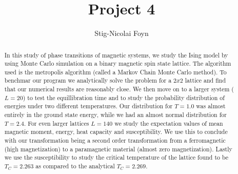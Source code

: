 \documentclass{emulateapj}
\begin{document}
\title{Project 4}

\author{Stig-Nicolai Foyn}




\begin{abstract}
In this study of phase transitions of magnetic systems, we study the Ising model by using Monte Carlo simulation on a binary magnetic spin state lattice. The algorithm used is the metropolis algorithm (called a Markov Chain Monte Carlo method). To benchmar our program we analytically solve the problem for a $2x2$ lattice and find that our numerical results are reasonably close. We then move on to a larger system ($L=20$) to test the equillibration time and to study the probability distribution of energies under two different temperatures. Our distribution for $T=1.0$ was almost entirely in the ground state energy, while we had an almost normal distribution for $T=2.4$. For even larger lattices $L=140$ we study the expectation values of mean magnetic moment, energy, heat capacity and susceptibility. We use this to conclude with our transformation being a second order transformation from a ferromagnetic (high magnetization) to a paramagnetic material (almost zero magnetization). Lastly we use the susceptibility to study the critical temperature of the lattice found to be $T_C=2.263$ as compared to the analytical $T_C = 2.269$.
\end{abstract}

\end{document}
